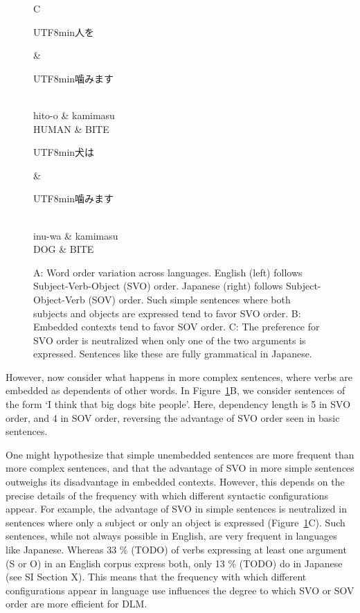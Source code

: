 \documentclass[11pt,a4paper]{article}
\newcommand{\japanese}[1]{\begin{CJK}{UTF8}{min}#1\end{CJK}}
\begin{document}
\begin{figure}
C
\begin{dependency}[theme = simple]
   \begin{deptext}[column sep=1em]
   \japanese{人を} \& \japanese{噛みます}\\ 
   hito-o \& kamimasu \\
   HUMAN \& BITE  \\
   \end{deptext}
\end{dependency}
\begin{dependency}[theme = simple]
   \begin{deptext}[column sep=1em]
   \japanese{犬は} \& \japanese{噛みます}\\ 
   inu-wa \& kamimasu \\
          DOG \& BITE  \\
   \end{deptext}
\end{dependency}

        \caption{A: Word order variation across languages. English (left) follows Subject-Verb-Object (SVO) order. Japanese (right) follows Subject-Object-Verb (SOV) order. Such simple sentences where both subjects and objects are expressed tend to favor SVO order. B: Embedded contexts tend to favor SOV order. C: The preference for SVO order is neutralized when only one of the two arguments is expressed. Sentences like these are fully grammatical in Japanese.}
        \label{fig:sent-dep}
\end{figure}

However, now consider what happens in more complex sentences, where verbs are embedded as dependents of other words.
In Figure~\ref{fig:sent-dep}B, we consider sentences of the form `I think that big dogs bite people'.
Here, dependency length is 5 in SVO order, and 4 in SOV order, reversing the advantage  of SVO order seen in basic sentences.

One might hypothesize that simple unembedded sentences are more frequent than more complex sentences, and that the advantage of SVO in more simple sentences outweighs its disadvantage in embedded contexts.
However, this depends on the precise details of the frequency with which different syntactic configurations appear.
For example, the advantage of SVO in simple sentences is neutralized in sentences where only a subject or only an object is expressed (Figure~\ref{fig:sent-dep}C).
Such sentences, while not always possible in English, are very frequent in languages like Japanese.
Whereas 33 \% (TODO)  of verbs expressing at least one argument (S or O) in an English corpus express both, only 13 \% (TODO) do in Japanese (see SI Section X).
This means that the frequency with which different configurations appear in language use influences the degree to which SVO or SOV order are more efficient for DLM.
\end{document}
